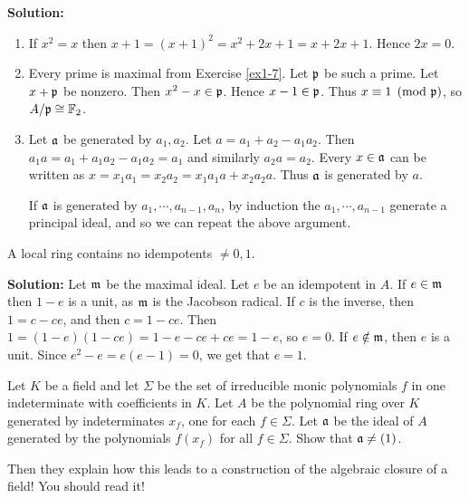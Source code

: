 \documentclass{article}
\begin{document}
\noindent\textbf{Solution:}
\begin{enumerate}
    \item
        If \(x^2 = x\) then \(x + 1 = (x + 1)^2 = x^2 + 2x + 1 = x + 2x + 1\).
        Hence \(2x = 0\).
    \item
        Every prime is maximal from Exercise \ref{ex1-7}.
        Let \(\mathfrak{p}\) be such a prime.
        Let \(x + \mathfrak{p}\) be nonzero.
        Then \(x^2 - x \in \mathfrak{p}\).
        Hence \(x - 1 \in \mathfrak{p}\).
        Thus \(x \equiv 1 \pmod{\mathfrak{p}}\), so \(A/\mathfrak{p} \cong \mathbb{F}_2\).
    \item
        Let \(\mathfrak{a}\) be generated by \(a_1, a_2\).
        Let \(a = a_1 + a_2 - a_1 a_2\).
        Then \(a_1 a = a_1 + a_1 a_2 - a_1 a_2 = a_1\) and similarly \(a_2 a = a_2\).
        Every \(x \in \mathfrak{a}\) can be written as \(x = x_1 a_1 = x_2 a_2 = x_1 a_1 a + x_2 a_2 a\).
        Thus \(\mathfrak{a}\) is generated by \(a\).

        If \(\mathfrak{a}\) is generated by \(a_1, \cdots, a_{n-1}, a_n\), by induction the \(a_1, \cdots, a_{n-1}\) generate a principal ideal, and so we can repeat the above argument.
\end{enumerate}

\begin{exercise} \label{ex1-12}
    A local ring contains no idempotents \(\neq 0,1\).
\end{exercise}

\noindent\textbf{Solution:}
Let \(\mathfrak{m}\) be the maximal ideal.
Let \(e\) be an idempotent in \(A\).
If \(e \in \mathfrak{m}\) then \(1 - e\) is a unit, as \(\mathfrak{m}\) is the Jacobson radical.
If \(c\) is the inverse, then \(1 = c - ce\), and then \(c = 1 - ce\).
Then \(1 = (1 - e)(1 - ce) = 1 - e - ce + ce = 1 - e\), so \(e = 0\).
If \(e \notin \mathfrak{m}\), then \(e\) is a unit.
Since \(e^2 - e = e (e-1) = 0\), we get that \(e = 1\).

\begin{exercise}
    Let \(K\) be a field and let \(\Sigma\) be the set of irreducible monic polynomials \(f\) in one indeterminate with coefficients in \(K\).
    Let \(A\) be the polynomial ring over \(K\) generated by indeterminates \(x_f\), one for each \(f \in \Sigma\).
    Let \(\mathfrak{a}\) be the ideal of \(A\) generated by the polynomials \(f(x_f)\) for all \(f \in \Sigma\).
    Show that \(\mathfrak{a} \neq (1)\).

    Then they explain how this leads to a construction of the algebraic closure of a field!
    You should read it!
\end{exercise}
\end{document}
